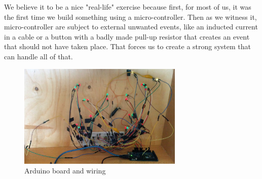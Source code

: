 We believe it to be a nice "real-life" exercise because first, for most of us, it was the first time we build something using a micro-controller. Then as we witness it, micro-controller are subject to external unwanted events, like an inducted current in a cable or a button with a badly made pull-up resistor that creates an event that should not have taken place. That forces us to create a strong system that can handle all of that.


\begin{figure}[H]\label{fig:ardhazard}
  \centering
    \includegraphics[width=0.7\textwidth]{../common/images/arduinowiring.jpg}
    \caption{Arduino board and wiring}
\end{figure}
